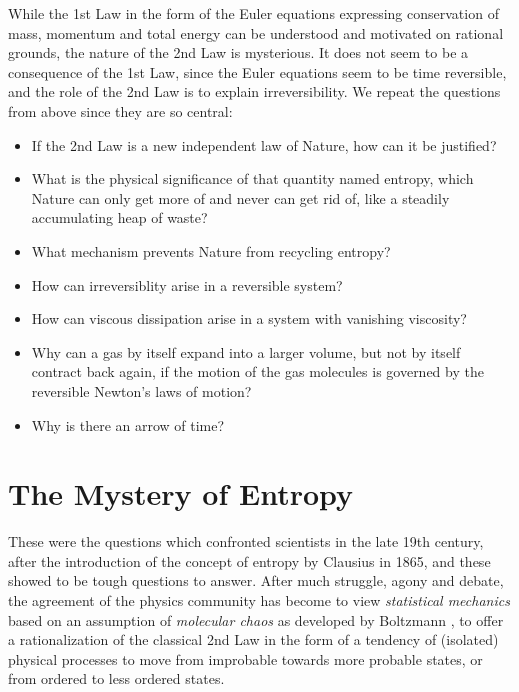 While the 1st Law in the form of the Euler equations
expressing conservation of mass, momentum and total energy
can be understood and motivated on rational grounds, 
the nature of the 2nd Law is mysterious.
It does not seem to be a consequence of the 1st Law, since the Euler
equations seem to be time reversible, and the role of the 2nd Law is to 
explain irreversibility. We repeat the questions from above since they are so central: 
\begin{itemize}
\item
If the 2nd Law is a new independent law of 
Nature, how can it be justified? 
\item What is the physical significance of that quantity named entropy, 
which Nature can only get more of and never can get rid of, like 
a steadily accumulating heap of waste? 
\item What mechanism prevents Nature from recycling entropy? 
\item How can irreversiblity arise in a reversible system? 
\item How can viscous dissipation arise in a 
system with vanishing viscosity? 
\item Why can a gas by itself expand
into a larger volume, but not by itself contract back again,
if the motion of the gas molecules is governed by the reversible Newton's
laws of motion? 
\item Why is there an arrow of time? 
\end{itemize}

  



\section{The Mystery of Entropy}

These were the questions which confronted scientists 
in the late 19th century, after the introduction  of the concept of entropy
by Clausius in 1865, and these showed to be tough questions to answer.
After much struggle, agony and debate, the agreement of the 
physics community has become to  
view \emph{statistical mechanics} based on an
assumption of \emph{molecular chaos} as developed by Boltzmann 
\cite{boltzmann}, 
to offer a rationalization of the classical 2nd Law in the form
of a tendency of (isolated) physical processes to move from improbable towards 
more probable states, or from ordered to less ordered states.

